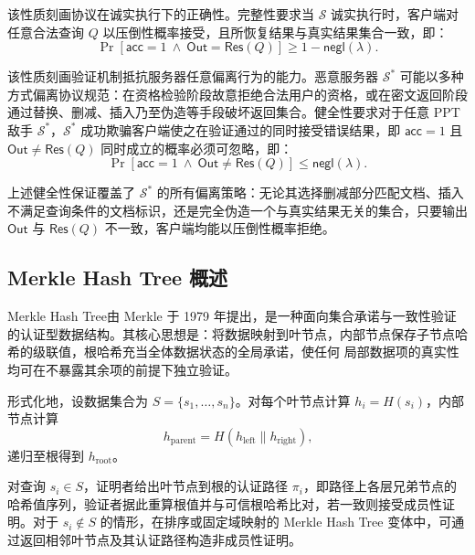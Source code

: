 \begin{definition}[完整性]\label{def:model-completeness}
该性质刻画协议在诚实执行下的正确性。完整性要求当 $\mathcal{S}$ 诚实执行时，客户端对任意合法查询 $Q$ 以压倒性概率接受，且所恢复结果与真实结果集合一致，即：
\begin{equation}
\Pr\!\left[\mathsf{acc}=1 \ \wedge\ \mathsf{Out} = \mathsf{Res}(Q)\right] \ge 1-\mathsf{negl}(\lambda).
\end{equation}
\end{definition}

\begin{definition}[健全性]\label{def:model-soundness}
该性质刻画验证机制抵抗服务器任意偏离行为的能力。恶意服务器 $\mathcal{S}^*$ 可能以多种方式偏离协议规范：在资格检验阶段故意拒绝合法用户的资格，或在密文返回阶段通过替换、删减、插入乃至伪造等手段破坏返回集合。健全性要求对于任意 PPT 敌手 $\mathcal{S}^*$，$\mathcal{S}^*$ 成功欺骗客户端使之在验证通过的同时接受错误结果，即 $\mathsf{acc}=1$ 且 $\mathsf{Out}\neq \mathsf{Res}(Q)$ 同时成立的概率必须可忽略，即：
\begin{equation}
\Pr\!\left[\mathsf{acc}=1 \ \wedge\ \mathsf{Out}\neq \mathsf{Res}(Q)\right]\le \mathsf{negl}(\lambda).
\end{equation}
\end{definition}

上述健全性保证覆盖了 $\mathcal{S}^*$ 的所有偏离策略：无论其选择删减部分匹配文档、插入不满足查询条件的文档标识，还是完全伪造一个与真实结果无关的集合，只要输出 $\mathsf{Out}$ 与 $\mathsf{Res}(Q)$ 不一致，客户端均能以压倒性概率拒绝。

\subsection{Merkle Hash Tree 概述}
Merkle Hash Tree由 Merkle 于 1979 年提出\cite{merkle1982secrecy,10.1007/0-387-34805-0_21}，是一种面向集合承诺与一致性验证的认证型数据结构\cite{10.1007/978-3-540-39658-1_2,martel2004general,naor1998certificate}。其核心思想是：将数据映射到叶节点，内部节点保存子节点哈希的级联值，根哈希充当全体数据状态的全局承诺，使任何
局部数据项的真实性均可在不暴露其余项的前提下独立验证。

形式化地，设数据集合为 $S=\{s_1,\ldots,s_n\}$。对每个叶节点计算 $h_i=H(s_i)$，内部节点计算
\begin{equation}
h_{\text{parent}}=H(h_{\text{left}}\|h_{\text{right}})\text{,}
\end{equation}
递归至根得到 $h_{\text{root}}$。

对查询 $s_i\in S$，证明者给出叶节点到根的认证路径 $\pi_i$，即路径上各层兄弟节点的哈希值序列，验证者据此重算根值并与可信根哈希比对，若一致则接受成员性证明。对于 $s_i\notin S$ 的情形，在排序或固定域映射的 Merkle Hash Tree 变体中，可通过返回相邻叶节点及其认证路径构造非成员性证明。


